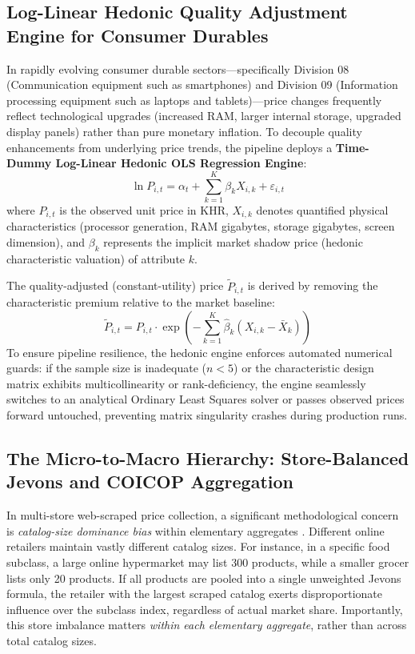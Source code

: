 \subsection{Log-Linear Hedonic Quality Adjustment Engine for Consumer Durables}
\hs In rapidly evolving consumer durable sectors—specifically Division 08 (Communication equipment such as smartphones) and Division 09 (Information processing equipment such as laptops and tablets)—price changes frequently reflect technological upgrades (increased RAM, larger internal storage, upgraded display panels) rather than pure monetary inflation. To decouple quality enhancements from underlying price trends, the pipeline deploys a \textbf{Time-Dummy Log-Linear Hedonic OLS Regression Engine}:
\begin{equation}
    \ln P_{i, t} = \alpha_t + \sum_{k=1}^K \beta_k X_{i, k} + \varepsilon_{i, t}
\end{equation}
where $P_{i, t}$ is the observed unit price in KHR, $X_{i, k}$ denotes quantified physical characteristics (processor generation, RAM gigabytes, storage gigabytes, screen dimension), and $\beta_k$ represents the implicit market shadow price (hedonic characteristic valuation) of attribute $k$.

\hs The quality-adjusted (constant-utility) price $\widetilde{P}_{i, t}$ is derived by removing the characteristic premium relative to the market baseline:
\begin{equation}
    \widetilde{P}_{i, t} = P_{i, t} \cdot \exp\left( -\sum_{k=1}^K \widehat{\beta}_k (X_{i, k} - \bar{X}_k) \right)
\end{equation}
\hs To ensure pipeline resilience, the hedonic engine enforces automated numerical guards: if the sample size is inadequate ($n < 5$) or the characteristic design matrix exhibits multicollinearity or rank-deficiency, the engine seamlessly switches to an analytical Ordinary Least Squares solver or passes observed prices forward untouched, preventing matrix singularity crashes during production runs.

\subsection{The Micro-to-Macro Hierarchy: Store-Balanced Jevons and COICOP Aggregation}\label{sec:store_balancing}
\hs In multi-store web-scraped price collection, a significant methodological concern is \textit{catalog-size dominance bias} within elementary aggregates \citep{imf2020cpi, cavallo2016billion}. Different online retailers maintain vastly different catalog sizes. For instance, in a specific food subclass, a large online hypermarket may list 300 products, while a smaller grocer lists only 20 products. If all products are pooled into a single unweighted Jevons formula, the retailer with the largest scraped catalog exerts disproportionate influence over the subclass index, regardless of actual market share. Importantly, this store imbalance matters \textit{within each elementary aggregate}, rather than across total catalog sizes.

